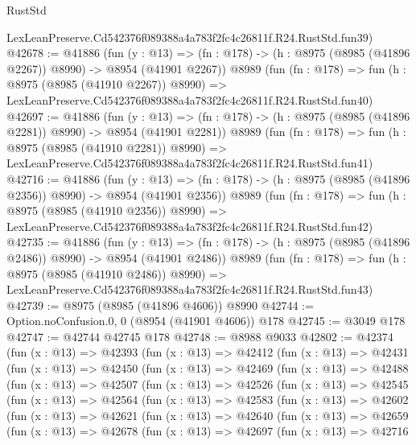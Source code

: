 \begin{lexlean}{RustStd}
\begin{coremodule}
    LexLeanPreserve.Cd542376f089388a4a783f2fc4c26811f.R24.RustStd.fun39)
@42678 := @41886
    (fun (y : @13) =>
    (fn : @178) -> (h : @8975 (@8985 (@41896 @2267)) @8990) -> @8954 (@41901 @2267))
    @8989
    (fun (fn : @178) =>
    fun (h : @8975 (@8985 (@41910 @2267)) @8990) =>
    LexLeanPreserve.Cd542376f089388a4a783f2fc4c26811f.R24.RustStd.fun40)
@42697 := @41886
    (fun (y : @13) =>
    (fn : @178) -> (h : @8975 (@8985 (@41896 @2281)) @8990) -> @8954 (@41901 @2281))
    @8989
    (fun (fn : @178) =>
    fun (h : @8975 (@8985 (@41910 @2281)) @8990) =>
    LexLeanPreserve.Cd542376f089388a4a783f2fc4c26811f.R24.RustStd.fun41)
@42716 := @41886
    (fun (y : @13) =>
    (fn : @178) -> (h : @8975 (@8985 (@41896 @2356)) @8990) -> @8954 (@41901 @2356))
    @8989
    (fun (fn : @178) =>
    fun (h : @8975 (@8985 (@41910 @2356)) @8990) =>
    LexLeanPreserve.Cd542376f089388a4a783f2fc4c26811f.R24.RustStd.fun42)
@42735 := @41886
    (fun (y : @13) =>
    (fn : @178) -> (h : @8975 (@8985 (@41896 @2486)) @8990) -> @8954 (@41901 @2486))
    @8989
    (fun (fn : @178) =>
    fun (h : @8975 (@8985 (@41910 @2486)) @8990) =>
    LexLeanPreserve.Cd542376f089388a4a783f2fc4c26811f.R24.RustStd.fun43)
@42739 := @8975 (@8985 (@41896 @4606)) @8990
@42744 := Option.noConfusion.{0, 0} (@8954 (@41901 @4606)) @178
@42745 := @3049 @178
@42747 := @42744 @42745 @178
@42748 := @8988 @9033
@42802 := @42374
    (fun (x : @13) =>
    @42393
      (fun (x : @13) =>
      @42412
        (fun (x : @13) =>
        @42431
          (fun (x : @13) =>
          @42450
            (fun (x : @13) =>
            @42469
              (fun (x : @13) =>
              @42488
                (fun (x : @13) =>
                @42507
                  (fun (x : @13) =>
                  @42526
                    (fun (x : @13) =>
                    @42545
                      (fun (x : @13) =>
                      @42564
                        (fun (x : @13) =>
                        @42583
                          (fun (x : @13) =>
                          @42602
                            (fun (x : @13) =>
                            @42621
                              (fun (x : @13) =>
                              @42640
                                (fun (x : @13) =>
                                @42659
                                  (fun (x : @13) =>
                                  @42678
                                    (fun (x : @13) =>
                                    @42697
                                      (fun (x : @13) =>
                                      @42716

\end{coremodule}
\end{lexlean}
